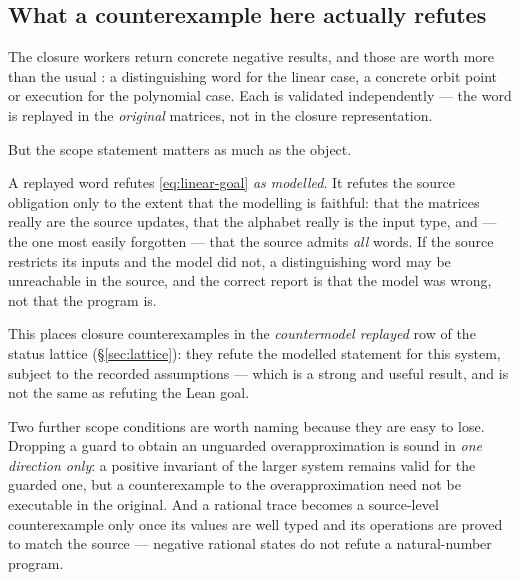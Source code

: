 \subsection{What a counterexample here actually refutes}

The closure workers return concrete negative results, and those are worth more
than the usual \unknown{}: a distinguishing word for the linear case, a
concrete orbit point or execution for the polynomial case. Each is validated
independently --- the word is replayed in the \emph{original} matrices, not in
the closure representation.

But the scope statement matters as much as the object.

\begin{remark}
A replayed word refutes \eqref{eq:linear-goal} \emph{as modelled}. It refutes
the source obligation only to the extent that the modelling is faithful: that
the matrices really are the source updates, that the alphabet really is the
input type, and --- the one most easily forgotten --- that the source admits
\emph{all} words. If the source restricts its inputs and the model did not,
a distinguishing word may be unreachable in the source, and the correct report
is that the model was wrong, not that the program is.
\end{remark}

This places closure counterexamples in the \emph{countermodel replayed} row of
the status lattice (\S\ref{sec:lattice}): they refute the modelled statement for
this system, subject to the recorded assumptions --- which is a strong and
useful result, and is not the same as refuting the Lean goal.

Two further scope conditions are worth naming because they are easy to lose.
Dropping a guard to obtain an unguarded overapproximation is sound in
\emph{one direction only}: a positive invariant of the larger system remains
valid for the guarded one, but a counterexample to the overapproximation need
not be executable in the original. And a rational trace becomes a source-level
counterexample only once its values are well typed and its operations are proved
to match the source --- negative rational states do not refute a
natural-number program.

